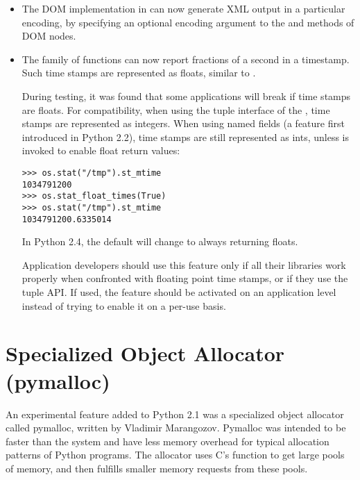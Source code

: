 \documentclass{howto}
\begin{document}
\begin{itemize}
\item The DOM implementation
in  can now generate XML output in a
particular encoding, by specifying an optional encoding argument to
the  and  methods of DOM nodes.

\item The  family of functions can now report
fractions of a second in a timestamp.  Such time stamps are
represented as floats, similar to .

During testing, it was found that some applications will break if time
stamps are floats.  For compatibility, when using the tuple interface
of the , time stamps are represented as integers.
When using named fields (a feature first introduced in Python 2.2),
time stamps are still represented as ints, unless
 is invoked to enable float return
values:

\begin{verbatim}
>>> os.stat("/tmp").st_mtime
1034791200
>>> os.stat_float_times(True)
>>> os.stat("/tmp").st_mtime
1034791200.6335014
\end{verbatim}

In Python 2.4, the default will change to always returning floats.

Application developers should use this feature only if all their
libraries work properly when confronted with floating point time
stamps, or if they use the tuple API. If used, the feature should be
activated on an application level instead of trying to enable it on a
per-use basis.

\end{itemize}


\section{Specialized Object Allocator (pymalloc)\label{section-pymalloc}}

An experimental feature added to Python 2.1 was a specialized object
allocator called pymalloc, written by Vladimir Marangozov.  Pymalloc
was intended to be faster than the system  and have
less memory overhead for typical allocation patterns of Python
programs.  The allocator uses C's  function to get
large pools of memory, and then fulfills smaller memory requests from
these pools.
\end{document}
